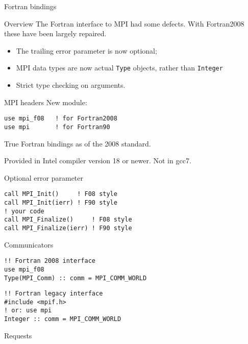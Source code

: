 \documentclass[11pt,headernav]{beamer}
\newcounter{tacc}
\begin{document}
 {Fortran bindings}

\lstset{language=Fortran}
\begin{numberedframe}{Overview}
  The Fortran interface to MPI had some defects.
  With Fortran2008 these have been largely repaired.
  \begin{itemize}
  \item The trailing error parameter is now optional;
  \item MPI data types are now actual \lstinline{Type} objects,
    rather than \lstinline{Integer}
  \item Strict type checking on arguments.
  \end{itemize}
\end{numberedframe}

\begin{numberedframe}{MPI headers}
\label{sl:mpi-header}
New module:
\begin{verbatim}
use mpi_f08   ! for Fortran2008
use mpi       ! for Fortran90
\end{verbatim}
True Fortran bindings as of the 2008 standard.
\begin{tacc}
Provided in Intel compiler version 18 or newer. Not in gcc7.
\end{tacc}
\end{numberedframe}

\begin{numberedframe}{Optional error parameter}
\lstset{language=Fortran}
\begin{lstlisting}
call MPI_Init()     ! F08 style
call MPI_Init(ierr) ! F90 style
! your code
call MPI_Finalize()     ! F08 style
call MPI_Finalize(ierr) ! F90 style
\end{lstlisting}
\end{numberedframe}

\begin{numberedframe}{Communicators}
\begin{lstlisting}
!! Fortran 2008 interface
use mpi_f08
Type(MPI_Comm) :: comm = MPI_COMM_WORLD
\end{lstlisting}
\begin{lstlisting}
!! Fortran legacy interface
#include <mpif.h>
! or: use mpi
Integer :: comm = MPI_COMM_WORLD
\end{lstlisting}
\end{numberedframe}

\begin{numberedframe}{Requests}
\end{numberedframe}
\end{document}
